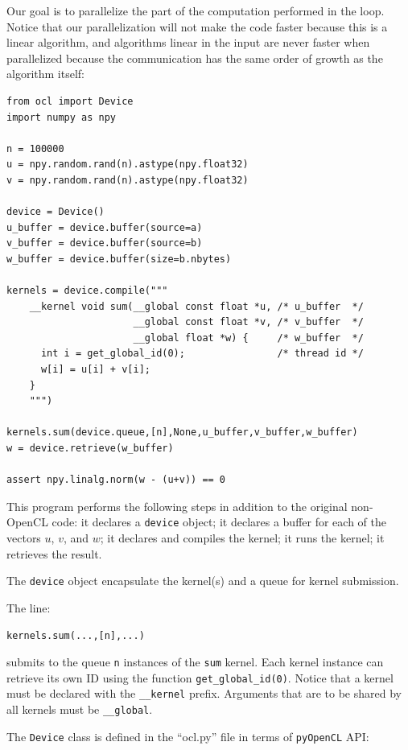 \documentclass[justified,sixbynine]{tufte-book}
\def\ft{\small\tt}
\theoremstyle{plain}%
\theoremstyle{definition}
\theoremstyle{remark}
\begin{document}
\begin{fullwidth}
Our goal is to parallelize the part of the computation performed in the loop. Notice that our parallelization will not make the code faster because this is a linear algorithm, and algorithms linear in the input are never faster when parallelized because the communication has the same order of growth as the algorithm itself:

\begin{lstlisting}
from ocl import Device
import numpy as npy

n = 100000
u = npy.random.rand(n).astype(npy.float32)
v = npy.random.rand(n).astype(npy.float32)

device = Device()
u_buffer = device.buffer(source=a)
v_buffer = device.buffer(source=b)
w_buffer = device.buffer(size=b.nbytes)

kernels = device.compile("""
    __kernel void sum(__global const float *u, /* u_buffer  */
                      __global const float *v, /* v_buffer  */
                      __global float *w) {     /* w_buffer  */
      int i = get_global_id(0);                /* thread id */
      w[i] = u[i] + v[i];
    }
    """)

kernels.sum(device.queue,[n],None,u_buffer,v_buffer,w_buffer)
w = device.retrieve(w_buffer)

assert npy.linalg.norm(w - (u+v)) == 0
\end{lstlisting}

This program performs the following steps in addition to the original non-OpenCL code:
it declares a {\ft device} object; it declares a buffer for each of the vectors $u$, $v$, and $w$; it declares and compiles the kernel; it runs the kernel; it retrieves the result.

The {\ft device} object encapsulate the kernel(s) and a queue for kernel submission.

The line:
\begin{lstlisting}
kernels.sum(...,[n],...)
\end{lstlisting}

submits to the queue {\ft n} instances of the {\ft sum} kernel. Each kernel instance can retrieve its own ID using the function {\ft get\_global\_id(0)}. Notice that a kernel must be declared with the {\ft \_\_kernel} prefix. Arguments that are to be shared by all kernels must be {\ft \_\_global}.


The {\ft Device} class is defined in the ``ocl.py'' file in terms of {\ft pyOpenCL} API:


\end{fullwidth}
\end{document}
